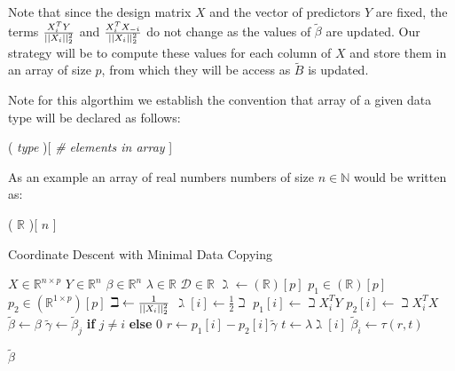 \documentclass[letterpaper,11pt]{article}
\begin{document}
Note that since the design matrix $X$ and the vector of predictors $Y$ are fixed,
 the terms $ \frac{ X_i^T Y }{ \lvert \lvert  X_i  \rvert \rvert_2^2 } $ and $\frac{ X_i^T X_{-i} }{ \lvert \lvert  X_i  \rvert \rvert_2^2 }$
do not change as the values of $\widetilde{\beta}$ are updated. Our strategy will be to
compute these values for each column of $X$ and store them in an array of size $p$,
from which they will be access as $\widetilde{B}$ is updated.

Note for this algorthim we establish the convention that array of a given data type
will be declared as follows:
\begin{center}
( \textit{type} )[ \textit{\# elements in array} ]
\end{center}

As an example an array of real numbers numbers of size $n \in \mathbb{N}$
would be written as:
\begin{center}
( $\mathbb{R}$ )[ $n$ ]
\end{center}

\FloatBarrier
\begin{algorithm}[!htbp]
  \caption{Coordinate Descent with Minimal Data Copying}
  \begin{algorithmic}[1]
  \Statex
  \Input{}
  \Statex $X \in \mathbb{R}^{n \times p} $ 
  \Statex $Y \in \mathbb{R}^n$  
  \Statex $\beta \in \mathbb{R}^n$  
  \Statex $\lambda \in \mathbb{R}$  
  \Statex $\mathcal{D} \in \mathbb{R}$  
    \State $\gimel \gets (\mathbb{R})[ p ]$ 
    \State $p_1 \in (\mathbb{R})[ p ]$ 
    \State $p_2 \in (\mathbb{R}^{ 1 \times p})[ p ]$ 
      \State $\beth \gets \frac{1}{\lvert \lvert X_i \rvert \rvert_2^2}$
      \State $\gimel [ i ] \gets \frac{1}{2} \beth$
      \State $p_1[ i ] \gets \beth X_i^T Y$
      \State $p_2[ i ] \gets \beth X_i^T X$
    \EndFor
    \State $\widetilde{\beta} \gets \beta$ 
      \Do
          \State $\widetilde{\gamma} \gets \widetilde{\beta}_j$ \textbf{if} $j \neq i$ \textbf{else} 0 
          \State $r \gets p_1[ i ] - p_2[ i ]\widetilde{\gamma}$ 
          \State $t \gets \lambda \gimel [ i ]$ 
          \State $\widetilde{\beta}_i \gets \tau \left( r, t \right)$ 
        \EndFor
      \\
  \end{algorithmic}
  \Return $\widetilde{\beta}$
\end{algorithm}
\FloatBarrier
\end{document}
